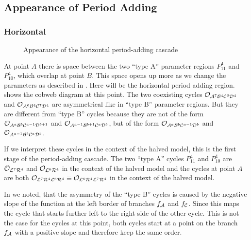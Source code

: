 \subsection{Appearance of Period Adding}

\subsubsection{Horizontal}

\begin{figure}
    \centering
    \caption{Appearance of the horizontal period-adding cascade}
\end{figure}

At point $A$ there is space between the two ``type A'' parameter regions $P_{11}^{4}$ and $P_{10}^{4}$, which overlap at point $B$.
This space opens up more as we change the parameters as described in .
Here will be the horizontal period adding region.
 shows the cobweb diagram at this point.
The two coexisting cycles $\mathcal{O}_{\mathcal{A}^7\mathcal{B}^4\mathcal{C}^6\mathcal{D}^4}$ and $\mathcal{O}_{\mathcal{A}^6\mathcal{B}^4\mathcal{C}^7\mathcal{D}^4}$ are asymmetrical like in ``type B'' parameter regions.
But they are different from ``type B'' cycles because they are not of the form $\mathcal{O}_{\mathcal{A}^a\mathcal{B}^b\mathcal{C}^{a-1}\mathcal{D}^{b+1}}$ and $\mathcal{O}_{\mathcal{A}^{a-1}\mathcal{B}^{b+1}\mathcal{C}^a\mathcal{D}^b}$, but of the form $\mathcal{O}_{\mathcal{A}^a\mathcal{B}^b\mathcal{C}^{a-1}\mathcal{D}^b}$ and $\mathcal{O}_{\mathcal{A}^{a-1}\mathcal{B}^b\mathcal{C}^a\mathcal{D}^b}$.

If we interpret these cycles in the context of the halved model, this is the first stage of the period-adding cascade.
The two ``type A'' cycles $P_{11}^4$ and $P_{10}^4$ are $\mathcal{O}_{\mathcal{L}^7\mathcal{R}^4}$ and $\mathcal{O}_{\mathcal{L}^6\mathcal{R}^4}$ in the context of the halved model and the cycles at point $A$ are both $\mathcal{O}_{\mathcal{L}^7\mathcal{R}^4\mathcal{L}^6\mathcal{R}^4} \equiv \mathcal{O}_{\mathcal{L}^6\mathcal{R}^4\mathcal{L}^7\mathcal{R}^4}$ in the context of the halved model.

In  we noted, that the asymmetry of the ``type B'' cycles is caused by the negative slope of the function at the left border of branches $f_{\mathcal{A}}$ and $f_{\mathcal{C}}$.
Since this maps the cycle that starts further left to the right side of the other cycle.
This is not the case for the cycles at this point, both cycles start at a point on the branch $f_{\mathcal{A}}$ with a positive slope and therefore keep the same order.

